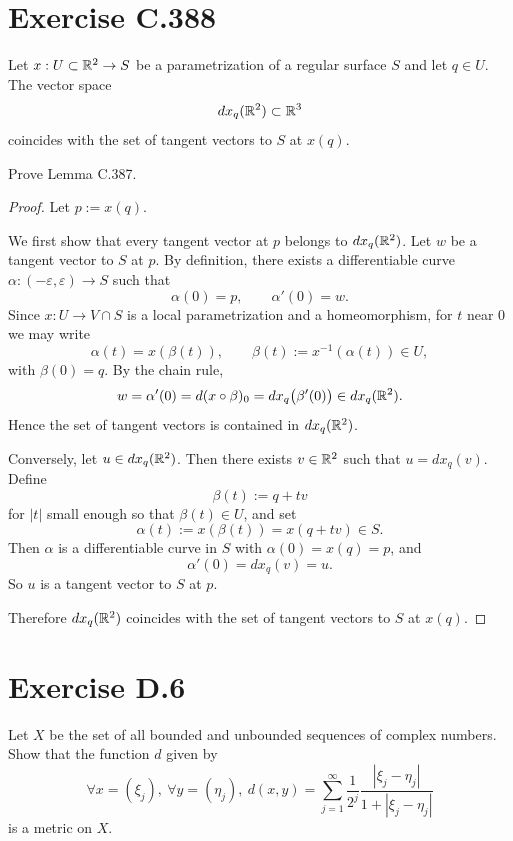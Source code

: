 \documentclass{article}
\begin{document}
\section{Exercise C.388}

\begin{lemma}[Lemma C.387]
  Let $x : U\subset\mathbb{R}^2 \to S$ be a parametrization of a regular surface
  $S$ and let $q\in U$. The vector space
  \[
    dx_q(\mathbb{R}^2)\subset\mathbb{R}^3
  \]
  coincides with the set of tangent vectors to $S$ at $x(q)$.
\end{lemma}

Prove Lemma C.387.

\begin{proof}
  Let $p:=x(q)$.

  We first show that every tangent vector at $p$ belongs to $dx_q(\mathbb{R}^2)$.
  Let $w$ be a tangent vector to $S$ at $p$. By definition, there exists
  a differentiable curve $\alpha:(-\varepsilon,\varepsilon)\to S$ such that
  \[
    \alpha(0)=p, \qquad \alpha'(0)=w.
  \]
  Since $x:U\to V\cap S$ is a local parametrization and a homeomorphism,
  for $t$ near $0$ we may write
  \[
    \alpha(t)=x(\beta(t)), \qquad
    \beta(t):=x^{-1}(\alpha(t))\in U,
  \]
  with $\beta(0)=q$. By the chain rule,
  \[
    w=\alpha'(0)=d(x\circ\beta)_0=dx_q\big(\beta'(0)\big)\in dx_q(\mathbb{R}^2).
  \]
  Hence the set of tangent vectors is contained in $dx_q(\mathbb{R}^2)$.

  Conversely, let $u\in dx_q(\mathbb{R}^2)$. Then there exists $v\in\mathbb{R}^2$ such that
  $u=dx_q(v)$. Define
  \[
    \beta(t):=q+tv
  \]
  for $|t|$ small enough so that $\beta(t)\in U$, and set
  \[
    \alpha(t):=x(\beta(t))=x(q+tv)\in S.
  \]
  Then $\alpha$ is a differentiable curve in $S$ with $\alpha(0)=x(q)=p$, and
  \[
    \alpha'(0)=dx_q(v)=u.
  \]
  So $u$ is a tangent vector to $S$ at $p$.

  Therefore $dx_q(\mathbb{R}^2)$ coincides with the set of tangent vectors to $S$
  at $x(q)$.
\end{proof}

\section{Exercise D.6}

Let $X$ be the set of all bounded and unbounded sequences of complex
numbers. Show that the function $d$ given by
\[
  \forall x=(\xi_j),\ \forall y=(\eta_j),\
  d(x,y)=\sum_{j=1}^{\infty}\frac{1}{2^j}\frac{|\xi_j-\eta_j|}{1+|\xi_j-\eta_j|}
\]
is a metric on $X$.
\end{document}
